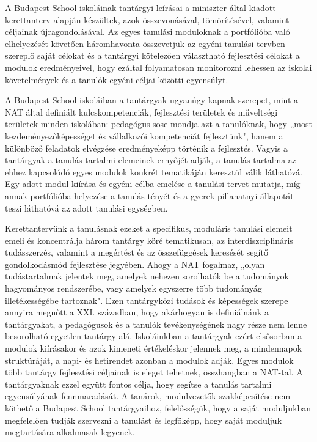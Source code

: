 A Budapest School iskoláinak tantárgyi leírásai a miniszter által kiadott
kerettanterv alapján készültek, azok összevonásával, tömörítésével, valamint
céljainak újragondolásával. Az egyes tanulási moduloknak a portfólióba való
elhelyezését követően háromhavonta összevetjük az egyéni tanulási tervben
szereplő saját célokat és a tantárgyi kötelezően választható fejlesztési
célokat a modulok eredményeivel, hogy ezáltal folyamatosan monitorozni lehessen
az iskolai követelmények és a tanulók egyéni céljai közötti egyensúlyt.

A Budapest School iskoláiban a tantárgyak ugyanúgy kapnak szerepet, mint a NAT
által definiált kulcskompetenciák, fejlesztési területek és műveltségi
területek minden iskolában: pedagógus sose mondja azt a tanulóknak, hogy „most
kezdeményezőképességet és vállalkozói kompetenciát fejlesztünk", hanem a
különböző feladatok elvégzése eredményeképp történik a fejlesztés. Vagyis a
tantárgyak a tanulás tartalmi elemeinek ernyőjét adják, a tanulás tartalma az
ehhez kapcsolódó egyes modulok konkrét tematikáján keresztül válik láthatóvá.
Egy adott modul kiírása és egyéni célba emelése a tanulási tervet mutatja, míg
annak portfólióba helyezése a tanulás tényét és a gyerek pillanatnyi állapotát
teszi láthatóvá az adott tanulási egységben.

Kerettantervünk a tanulásnak ezeket a specifikus, moduláris tanulási elemeit
emeli és koncentrálja három tantárgy köré tematikusan, az interdiszciplináris
tudásszerzés, valamint a megértést és az összefüggések keresését segítő
gondolkodásmód fejlesztése jegyében. Ahogy a NAT fogalmaz, „olyan
tudástartalmak jelentek meg, amelyek nehezen sorolhatók be a tudományok
hagyományos rendszerébe, vagy amelyek egyszerre több tudományág illetékességébe
tartoznak". Ezen tantárgyközi tudások és képességek szerepe annyira megnőtt a
XXI. században, hogy akárhogyan is definiálnánk a tantárgyakat, a pedagógusok
és a tanulók tevékenységének nagy része nem lenne besorolható egyetlen tantárgy
alá. Iskoláinkban a tantárgyak ezért elsősorban a modulok kiírásakor és azok
kimeneti értékeléskor jelennek meg, a mindennapok struktúráját, a napi- és
hetirendet azonban a modulok adják. Egyes modulok több tantárgy fejlesztési
céljainak is eleget tehetnek, összhangban a NAT-tal. A tantárgyaknak ezzel
együtt fontos célja, hogy segítse a tanulás tartalmi egyensúlyának
fennmaradását. A tanárok, modulvezetők szakképesítése nem köthető a Budapest
School tantárgyaihoz, felelősségük, hogy a saját moduljukban megfelelően tudják
szervezni a tanulást és legfőképp, hogy saját moduljuk megtartására alkalmasak
legyenek.

